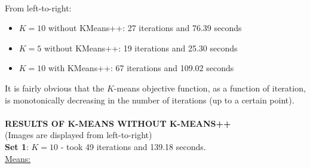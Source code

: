 \documentclass[submit]{harvardml}
\begin{document}
\\\noindent From left-to-right: 
	\begin{itemize}
		\item $K = 10$ without KMeans++: 27 iterations and 76.39 seconds
		\item $K=5$ without KMeans++: 19 iterations and 25.30 seconds
		\item $K=10$ with KMeans++: 67 iterations and 109.02 seconds
	\end{itemize}
It is fairly obvious that the $K$-means objective function, as a function of iteration, is monotonically decreasing in the number of iterations (up to a certain point).\\ \\
\textbf{RESULTS OF K-MEANS WITHOUT K-MEANS++} \\
(Images are displayed from left-to-right)\\
\textbf{Set 1}: $K = 10$ - took 49 iterations and 139.18 seconds.  \\ 
\underline{Means:}
\end{document}
